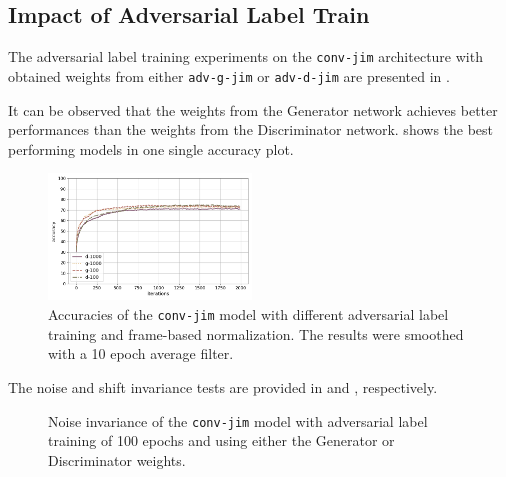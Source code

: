 \subsection{Impact of Adversarial Label Train}\label{sec:exp_adv_label}
The adversarial label training experiments on the \texttt{conv-jim} architecture with obtained weights from either \texttt{adv-g-jim} or \texttt{adv-d-jim} are presented in .

It can be observed that the weights from the Generator network achieves better performances than the weights from the Discriminator network.
 shows the best performing models in one single accuracy plot.
\begin{figure}[!ht]
  \centering
  \includegraphics[width=0.48\textwidth]{./5_exp/figs/exp_adv_label_acc_conv-jim.png}
  \caption{Accuracies of the \texttt{conv-jim} model with different adversarial label training and frame-based normalization. The results were smoothed with a 10 epoch average filter.}
  \label{fig:exp_adv_label_acc_conv-jim}
\end{figure}
\FloatBarrier
\noindent
The noise and shift invariance tests are provided in  and , respectively.
\begin{figure}[!ht]
  \centering
  \qquad
  \caption{Noise invariance of the \texttt{conv-jim} model with adversarial label training of 100 epochs and using either the Generator or Discriminator weights.}
  \label{fig:exp_adv_label_tb_noise_conv-jim}
\end{figure}
